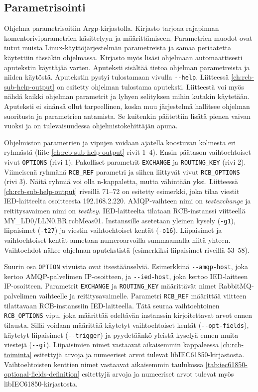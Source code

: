 \subsection{Parametrisointi}
Ohjelma parametrisoitiin Argp-kirjastolla. Kirjasto tarjoaa rajapinnan komentoriviparametrien käsittelyyn ja määrittämiseen. Parametrien muodot ovat tutut muista Linux-käyt\-tö\-jär\-jes\-tel\-män parametreista ja samaa periaatetta käytettiin tässäkin ohjelmassa. Kirjasto myös lisäsi ohjelmaan automaattisesti aputekstin käyttäjää varten. Aputeksti sisältää tietoa ohjelman parametreista ja niiden käytöstä. Aputekstin pystyi tulostamaan vivulla \texttt{-{}-help}. Liitteessä \ref{ch:rcb-sub-help-output} on esitetty ohjelman tulostama aputeksti. Liitteestä voi myös nähdä kaikki ohjelman parametrit ja lyhyen selityksen mihin kutakin käytetään. Aputeksti ei sinänsä ollut tarpeellinen, koska muu järjestelmä hallitsee ohjelman suoritusta ja parametrien antamista. Se kuitenkin päätettiin lisätä pienen vaivan vuoksi ja on tulevaisuudessa ohjelmistokehittäjän apuna.

Ohjelmiston parametrien ja vipujen voidaan ajatella koostuvan kolmesta eri ryhmästä (liite \ref{ch:rcb-sub-help-output} rivit 1--4). Ensin päätason vaihtoehtoiset vivut \texttt{OPTIONS} (rivi 1). Pakolliset parametrit \texttt{EXCHANGE} ja \texttt{ROUTING\_KEY} (rivi 2). Viimeisenä ryhmänä \texttt{RCB\_REF} parametri ja siihen liittyvät vivut \texttt{RCB\_OPTIONS} (rivi 3). Näitä ryhmiä voi olla n-kappaletta, mutta vähintään yksi. Liitteessä \ref{ch:rcb-sub-help-output} riveillä 71--72 on esitetty esimerkki, joka tilaa viestit IED-laitteelta osoitteesta 192.168.2.220. AMQP-vaihteen nimi on \emph{testexchange} ja reititysavaimen nimi on \emph{testkey}. IED-laitteelta tilataan RCB-instanssi viitteellä MY\_LD0\-/\-LLN0\-.\-BR\-.\-rcbMeas01. Instanssille asetetaan yleinen kysely (\texttt{-g1}), liipaisimet (\texttt{-t27}) ja viestin vaihtoehtoiset kentät (\texttt{-o16}). Liipaisimet ja vaihtoehtoiset kentät annetaan numeroarvoilla summaamalla niitä yhteen. Vaihtoehdot näkee ohjelman aputekstistä (esimerkiksi liipaisimet riveillä 53--58).

Suurin osa \texttt{OPTION} vivuista ovat itsestäänselviä. Esimerkkinä \texttt{-{}-amqp-host}, joka kertoo A\-M\-Q\-P-pal\-ve\-li\-men IP-osoitteen, ja \texttt{-{}-ied-host}, joka kertoo IED-laitteen IP-osoitteen. Parametrit \texttt{EXCHANGE} ja \texttt{ROUTING\_KEY} määrittävät nimet RabbitMQ-palvelimen vaihteelle ja reititysavaimelle. Parametri \texttt{RCB\_REF} määrittää viitteen tilattavaan RCB-instanssiin IED-laitteella. Tätä seuraa vaihtoehtoinen \texttt{RCB\_OPTIONS} vipu, joka määrittää edeltävän instanssin kirjoitettavat arvot ennen tilausta. Sillä voidaan määrittää käytetyt vaihtoehtoiset kentät (\texttt{-{}-opt-fields}), käytetyt liipaisimet (\texttt{-{}-trigger}) ja pyydetäänkö yleistä kyselyä ennen muita viestejä (\texttt{-{}-gi}). Liipaisimien nimet vastaavat aikaisemmin kappaleessa \ref{ch:rcb-toiminta} esitettyjä arvoja ja numeeriset arvot tulevat libIEC61850-kirjastosta. Vaihtoehtoisten kenttien nimet vastaavat aikaisemmin taulukossa \ref{tab:iec61850-optional-fields-definition} esitettyjä arvoja ja numeeriset arvot tulevat myös libIEC61850-kirjastosta.

